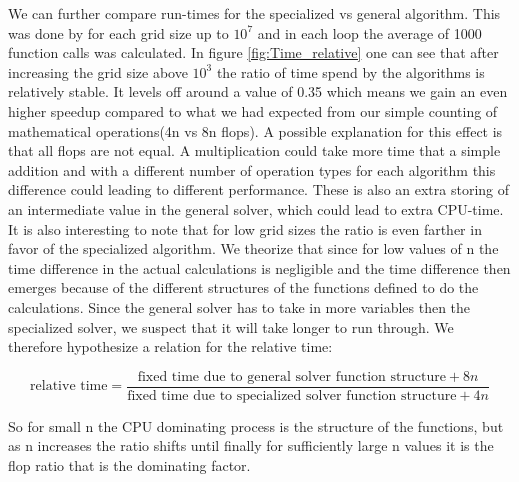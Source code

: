 \documentclass[a4paper,11pt]{article}
\begin{document}
{We can further compare run-times for the specialized vs general algorithm. This was done by for each grid size up to $10^7$ and in each loop the average of 1000 function calls was calculated. In figure \ref{fig:Time_relative} one can see that after increasing the grid size above $10^3$ the ratio of time spend by the algorithms is relatively stable. It levels off around a value of 0.35 which means we gain an even higher speedup compared to what we had expected from our simple counting of mathematical operations(4n vs 8n flops). A possible explanation for this effect is that all flops are not equal. A multiplication could take more time that a simple addition and with a different number of operation types for each algorithm this difference could leading to different performance. These is also an extra storing of an intermediate value in the general solver, which could lead to extra CPU-time. It is also interesting to note that for low grid sizes the ratio is even farther in favor of the specialized algorithm. We theorize that since for low values of n the time difference in the actual calculations is negligible and the time difference then emerges because of the different structures of the functions defined to do the calculations. Since the general solver has to take in more variables then the specialized solver, we suspect that it will take longer to run through. We therefore hypothesize a relation for the relative time:

\begin{equation}
\text{relative time} = \frac{\text{fixed time due to general solver function structure} + 8n}{\text{fixed time due to specialized solver function structure} + 4n}
\end{equation}

So for small n the CPU dominating process is the structure of the functions, but as n increases the ratio shifts until finally for sufficiently large n values it is the flop ratio that is the dominating factor.
		
}
\end{document}

